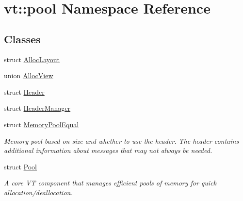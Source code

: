 \hypertarget{namespacevt_1_1pool}{}\section{vt\+:\+:pool Namespace Reference}
\label{namespacevt_1_1pool}
\subsection*{Classes}
\begin{DoxyCompactItemize}
\item 
struct \hyperlink{structvt_1_1pool_1_1_alloc_layout}{Alloc\+Layout}
\item 
union \hyperlink{unionvt_1_1pool_1_1_alloc_view}{Alloc\+View}
\item 
struct \hyperlink{structvt_1_1pool_1_1_header}{Header}
\item 
struct \hyperlink{structvt_1_1pool_1_1_header_manager}{Header\+Manager}
\item 
struct \hyperlink{structvt_1_1pool_1_1_memory_pool_equal}{Memory\+Pool\+Equal}
\begin{DoxyCompactList}\small\item\em Memory pool based on size and whether to use the header. The header contains additional information about messages that may not always be needed. \end{DoxyCompactList}\item 
struct \hyperlink{structvt_1_1pool_1_1_pool}{Pool}
\begin{DoxyCompactList}\small\item\em A core VT component that manages efficient pools of memory for quick allocation/deallocation. \end{DoxyCompactList}\end{DoxyCompactItemize}
